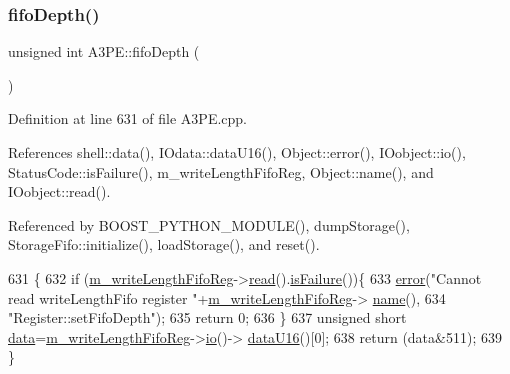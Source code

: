 \mbox{\label{classA3PE_a8bb523e4a7a5dbb6ab3c5549ebf6db86}} 
\subsubsection{\texorpdfstring{fifo\+Depth()}{fifoDepth()}}
{\footnotesize\ttfamily unsigned int A3\+P\+E\+::fifo\+Depth (\begin{DoxyParamCaption}{ }\end{DoxyParamCaption})}



Definition at line 631 of file A3\+P\+E.\+cpp.



References shell\+::data(), I\+Odata\+::data\+U16(), Object\+::error(), I\+Oobject\+::io(), Status\+Code\+::is\+Failure(), m\+\_\+write\+Length\+Fifo\+Reg, Object\+::name(), and I\+Oobject\+::read().



Referenced by B\+O\+O\+S\+T\+\_\+\+P\+Y\+T\+H\+O\+N\+\_\+\+M\+O\+D\+U\+L\+E(), dump\+Storage(), Storage\+Fifo\+::initialize(), load\+Storage(), and reset().


\begin{DoxyCode}
631                             \{
632   \textcolor{keywordflow}{if} (\hyperlink{classA3PE_a9a0cb2253ea34c0be567a03684217fee}{m\_writeLengthFifoReg}->\hyperlink{classIOobject_aa07610c11963b1db6710e3c76ceea456}{read}().\hyperlink{classStatusCode_a5dd22dc6eb2c52fc4cabc58f6dea2eb7}{isFailure}())\{
633     \hyperlink{classObject_a204a95f57818c0f811933917a30eff45}{error}(\textcolor{stringliteral}{"Cannot read writeLengthFifo register "}+\hyperlink{classA3PE_a9a0cb2253ea34c0be567a03684217fee}{m\_writeLengthFifoReg}->
      \hyperlink{classObject_a300f4c05dd468c7bb8b3c968868443c1}{name}(),
634         \textcolor{stringliteral}{"Register::setFifoDepth"});
635     \textcolor{keywordflow}{return} 0;
636   \}
637   \textcolor{keywordtype}{unsigned} \textcolor{keywordtype}{short} \hyperlink{namespaceshell_a5ea2525995cedc3efd69ea8a7f034d1e}{data}=\hyperlink{classA3PE_a9a0cb2253ea34c0be567a03684217fee}{m\_writeLengthFifoReg}->\hyperlink{classIOobject_af04fb94137c3d86849f478ac5afab5d1}{io}()->
      \hyperlink{classIOdata_a8d8528b731c6cf117f8c5b9b2473390c}{dataU16}()[0];
638   \textcolor{keywordflow}{return} (data&511);   
639 \}
\end{DoxyCode}
\mbox{\label{classA3PE_a7f6959a6a38c16fa6609560827413764}} 
